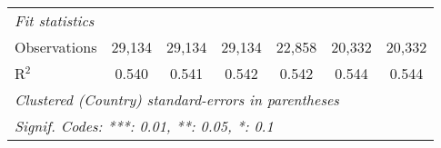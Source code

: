 \begin{tabular}{lcccccc}
   \midrule \emph{Fit statistics}\\
   Observations                                                                                        & 29,134  & 29,134        & 29,134         & 22,858         & 20,332         & 20,332\\  
   R$^2$                                                                                               & 0.540   & 0.541         & 0.542          & 0.542          & 0.544          & 0.544\\  
   \midrule
   \multicolumn{7}{l}{\emph{Clustered (Country) standard-errors in parentheses}}\\
   \multicolumn{7}{l}{\emph{Signif. Codes: ***: 0.01, **: 0.05, *: 0.1}}\\
\end{tabular}
\par\endgroup


